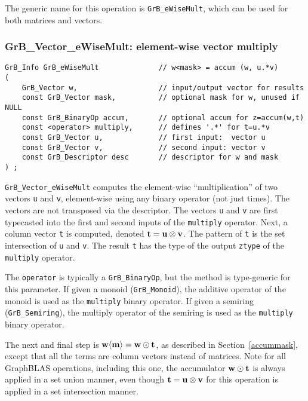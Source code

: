 \documentclass[12pt]{article}
\begin{document}
The generic name for this operation is \verb'GrB_eWiseMult', which can be used
for both matrices and vectors.

\newpage
\subsubsection{{\sf GrB\_Vector\_eWiseMult:} element-wise vector multiply}
\label{eWiseMult_vector}

\begin{mdframed}[userdefinedwidth=6in]
{\footnotesize
\begin{verbatim}
GrB_Info GrB_eWiseMult              // w<mask> = accum (w, u.*v)
(
    GrB_Vector w,                   // input/output vector for results
    const GrB_Vector mask,          // optional mask for w, unused if NULL
    const GrB_BinaryOp accum,       // optional accum for z=accum(w,t)
    const <operator> multiply,      // defines '.*' for t=u.*v
    const GrB_Vector u,             // first input:  vector u
    const GrB_Vector v,             // second input: vector v
    const GrB_Descriptor desc       // descriptor for w and mask
) ;
\end{verbatim}
} \end{mdframed}

\verb'GrB_Vector_eWiseMult' computes the element-wise ``multiplication'' of two
vectors \verb'u' and \verb'v', element-wise using any binary operator (not just
times).  The vectors are not transposed via the descriptor.  The vectors
\verb'u' and \verb'v' are first typecasted into the first and second inputs of
the \verb'multiply' operator.  Next, a column vector \verb't' is computed,
denoted ${\bf t = u \otimes v}$.  The pattern of \verb't' is the set
intersection of \verb'u' and \verb'v'.  The result \verb't' has the type of the
output \verb'ztype' of the \verb'multiply' operator.

The \verb'operator' is typically a \verb'GrB_BinaryOp', but the method is
type-generic for this parameter.  If given a monoid (\verb'GrB_Monoid'), the
additive operator of the monoid is used as the \verb'multiply' binary operator.
If given a semiring (\verb'GrB_Semiring'), the multiply operator of the
semiring is used as the \verb'multiply' binary operator.

The next and final step is ${\bf w \langle m \rangle  = w \odot t}$, as
described in Section~\ref{accummask}, except that all the terms are column
vectors instead of matrices.  Note for all GraphBLAS operations, including this
one, the accumulator ${\bf w \odot t}$ is always applied in a set union manner,
even though ${\bf t = u \otimes v}$ for this operation is applied in a set
intersection manner.
\end{document}
